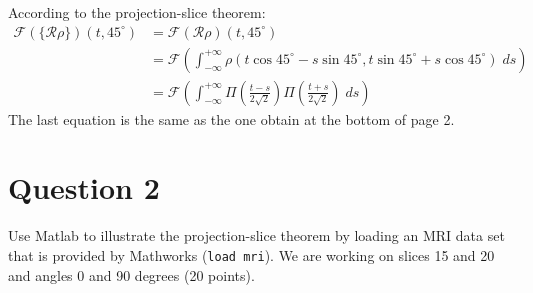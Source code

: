 \documentclass[12pt,twoside]{article}
\begin{document}
\begin{enumerate}
According to the projection-slice theorem:
\begin{align*}
    \mathcal{F} \left( \{ \mathcal{R} \rho \} \right)(t,  45^{\circ}) &= \mathcal{F} \left( \mathcal{R} \rho  \right)(t, 45^{\circ}) \\
    &= \mathcal{F} \left( \int_{-\infty}^{+\infty} \rho \left(t \cos{45^{\circ}} - s \sin {45^{\circ}}, t  \sin {45^{\circ}} + s \cos{45^{\circ}} \right) \; ds \right) \\
    &= \mathcal{F} \left( \int_{-\infty}^{+\infty} \Pi\left(\frac{t - s}{2 \sqrt{2}}\right) \Pi\left(\frac{t + s}{2 \sqrt{2}}\right) \; ds \right)
\end{align*}
The last equation is the same as the one obtain at the bottom of page 2.

  \end{enumerate}
\section*{Question 2}

\noindent
Use Matlab to illustrate the projection-slice theorem by loading an MRI data set that is provided by Mathworks (\texttt{load mri}). 
We are working on slices 15 and 20 and angles 0 and 90 degrees (20 points).
\end{document}
